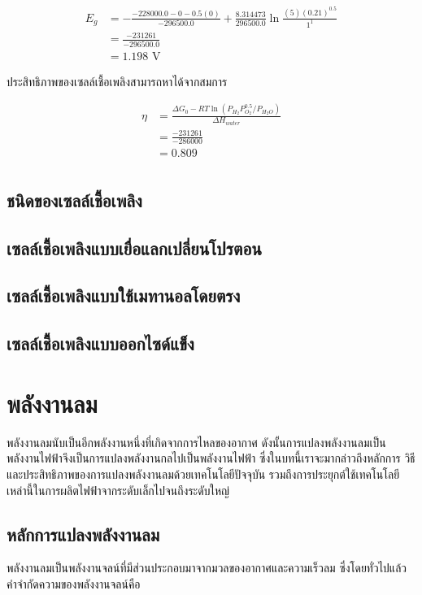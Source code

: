 \documentclass[a4paper,nobib,openany]{tufte-book}
\begin{document}
\begin{align*}
E_g &= - \frac{-228000.0-0- 0.5(0)}{-296500.0} + \frac{8.314473}{296500.0} \ln \frac{(5)(0.21)^{0.5}}{1^1} \\
&= \frac{-231261}{-296500.0} \\
&= 1.198\text{ V}
\end{align*}

ประสิทธิภาพของเซลล์เชื้อเพลิงสามารถหาได้จากสมการ

\begin{align*}
\eta &= \frac{\Delta G_0 - RT \ln (P_{H_2} P_{O_2}^{0.5}/ P_{H_2O})}{\Delta H_{water}} \\
&= \frac{-231261}{-286000} \\ 
&=0.809\\
\end{align*}

\section{ชนิดของเซลล์เชื้อเพลิง}
\label{sec:org8d7a04f}
\section{เซลล์เชื้อเพลิงแบบเยื่อแลกเปลี่ยนโปรตอน}
\label{sec:orgc40f3cb}
\section{เซลล์เชื้อเพลิงแบบใช้เมทานอลโดยตรง}
\label{sec:org38f78c6}
\section{เซลล์เชื้อเพลิงแบบออกไซด์แข็ง}
\label{sec:orgb0d291a}
\chapter{พลังงานลม}
\label{sec:org5e0b7f7}
พลังงานลมนับเป็นอีกพลังงานหนึ่งที่เกิดจากการไหลของอากาศ
ดังนั้นการแปลงพลังงานลมเป็นพลังงานไฟฟ้าจึงเป็นการแปลงพลังงานกลไปเป็นพลังงานไฟฟ้า
ซึ่งในบทนี้เราจะมากล่าวถึงหลักการ วิธี
และประสิทธิภาพของการแปลงพลังงานลมด้วยเทคโนโลยีปัจจุบัน
รวมถึงการประยุกต์ใช้เทคโนโลยีเหล่านี้ในการผลิตไฟฟ้าจากระดับเล็กไปจนถึงระดับใหญ่

\section{หลักการแปลงพลังงานลม}
\label{sec:org6728532}
พลังงานลมเป็นพลังงานจลน์ที่มีส่วนประกอบมาจากมวลของอากาศและความเร็วลม
ซึ่งโดยทั่วไปแล้ว คำจำกัดความของพลังงานจลน์คือ
\end{document}
